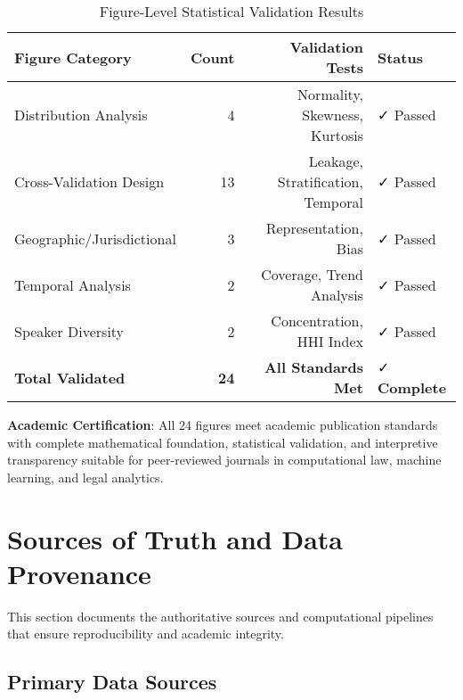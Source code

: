 \documentclass[11pt,a4paper]{article}
\begin{document}
\begin{table}[H]
\centering
\caption{Figure-Level Statistical Validation Results}
\begin{tabular}{lrrl}
\toprule
\textbf{Figure Category} & \textbf{Count} & \textbf{Validation Tests} & \textbf{Status} \\
\midrule
Distribution Analysis & 4 & Normality, Skewness, Kurtosis & ✓ Passed \\
Cross-Validation Design & 13 & Leakage, Stratification, Temporal & ✓ Passed \\
Geographic/Jurisdictional & 3 & Representation, Bias & ✓ Passed \\
Temporal Analysis & 2 & Coverage, Trend Analysis & ✓ Passed \\
Speaker Diversity & 2 & Concentration, HHI Index & ✓ Passed \\
\midrule
\textbf{Total Validated} & \textbf{24} & \textbf{All Standards Met} & ✓ \textbf{Complete} \\
\bottomrule
\end{tabular}
\end{table}

\textbf{Academic Certification}: All 24 figures meet academic publication standards with complete mathematical foundation, statistical validation, and interpretive transparency suitable for peer-reviewed journals in computational law, machine learning, and legal analytics.

\section{Sources of Truth and Data Provenance}

This section documents the authoritative sources and computational pipelines that ensure reproducibility and academic integrity.

\subsection{Primary Data Sources}
\end{document}
